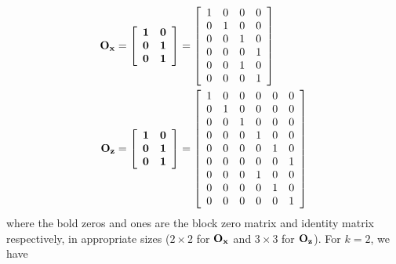 \begin{equation}
\begin{split}
{\bf O}_{\bf x}&=\left[
             \begin{array}{cc}
               \bf 1 & \bf 0 \\
               \bf 0 & \bf 1 \\
               \bf 0 & \bf 1 \\
             \end{array}
           \right]=\left[
               \begin{array}{cccc}
                 1 & 0 & 0 & 0 \\
                 0 & 1 & 0 & 0 \\
                 0 & 0 & 1 & 0 \\
                 0 & 0 & 0 & 1 \\
                 0 & 0 & 1 & 0 \\
                 0 & 0 & 0 & 1 \\
               \end{array}
             \right]\\
{\bf O}_{\bf z}&=\left[
             \begin{array}{cc}
               \bf 1 & \bf 0 \\
               \bf 0 & \bf 1 \\
               \bf 0 & \bf 1 \\
             \end{array}
           \right]=\left[
               \begin{array}{cccccc}
                 1 & 0 & 0 & 0 & 0 & 0\\
                 0 & 1 & 0 & 0 & 0 & 0\\
                 0 & 0 & 1 & 0 & 0 & 0\\
                 0 & 0 & 0 & 1 & 0 & 0\\
                 0 & 0 & 0 & 0 & 1 & 0\\
                 0 & 0 & 0 & 0 & 0 & 1\\
                 0 & 0 & 0 & 1 & 0 & 0\\
                 0 & 0 & 0 & 0 & 1 & 0\\
                 0 & 0 & 0 & 0 & 0 & 1\\
               \end{array}
             \right]
\end{split}
\end{equation}
where the bold zeros and ones are the block zero matrix and identity matrix respectively, in appropriate sizes ($2\times 2$ for ${\bf O}_{\bf x}$ and $3\times 3$ for ${\bf O}_{\bf z}$). For $k=2$, we have
